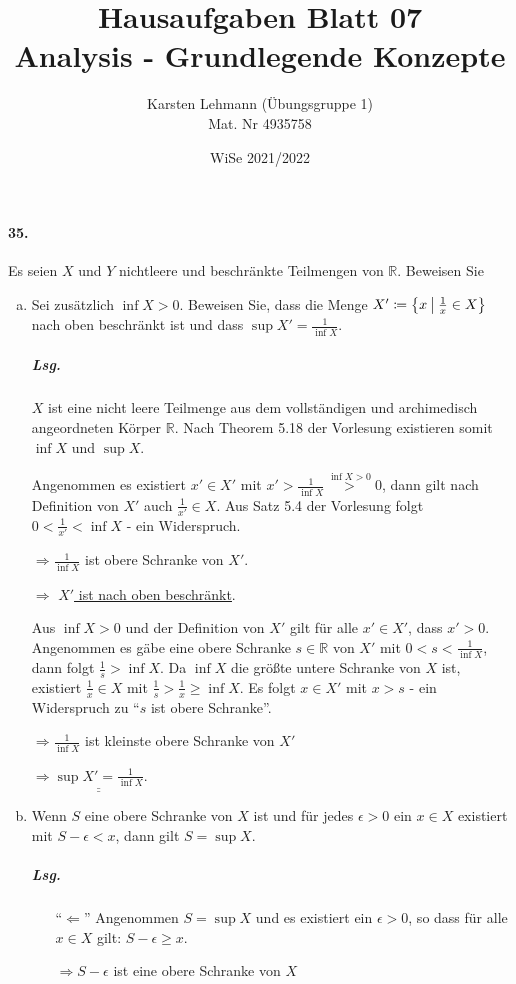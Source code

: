 \documentclass{scrreprt}
\author{Karsten Lehmann (Übungsgruppe 1)\\Mat. Nr 4935758}
\date{WiSe 2021/2022}
\title{Hausaufgaben Blatt 07\\Analysis - Grundlegende Konzepte}
\begin{document}
\paragraph{35.} Es seien $X$ und $Y$ nichtleere und beschränkte Teilmengen von
$\mathbb{R}$.
Beweisen Sie
\begin{enumerate}[(a)]
\item Sei zusätzlich $\inf X > 0$.
  Beweisen Sie, dass die Menge
  $X' \coloneqq \qty\big{x \: {\big |} \: \frac{1}{x} \in X}$
  nach oben beschränkt ist und dass
  $\sup X' = \frac{1}{\inf X}$.

  \subparagraph{Lsg.} $X$ ist eine nicht leere Teilmenge aus dem vollständigen
  und archimedisch angeordneten Körper $\mathbb{R}$.
  Nach Theorem 5.18 der Vorlesung existieren somit $\inf X$ und $\sup X$.

  Angenommen es existiert $x' \in X'$ mit
  $x' > \frac{1}{\inf X} \overset{\inf X > 0}> 0$, dann gilt nach Definition
  von $X'$ auch $\frac{1}{x'} \in X$.
  Aus Satz 5.4 der Vorlesung folgt $0 < \frac{1}{x'} < \inf X$ - ein Widerspruch.

  $\Rightarrow \frac{1}{\inf X}$ ist obere Schranke von $X'$.

  $\Rightarrow$ \underline{\underline{$X'$ ist nach oben beschränkt}}.

  Aus $\inf X > 0$ und der Definition von $X'$ gilt für alle
  $x' \in X'$, dass $x' > 0$.
  Angenommen es gäbe eine obere Schranke $s \in \mathbb{R}$ von $X'$ mit
  $0 < s < \frac{1}{\inf X}$, dann folgt $\frac{1}{s} > \inf X$.
  Da $\inf X$ die größte untere Schranke von $X$ ist, existiert
  $\frac{1}{x} \in X$ mit $\frac{1}{s} > \frac{1}{x} \geq \inf X$.
  Es folgt $x \in X'$ mit $x > s$ - ein Widerspruch zu
  ``$s$ ist obere Schranke''.

  $\Rightarrow \frac{1}{\inf X}$ ist kleinste obere Schranke von $X'$

  $\Rightarrow \underline{\underline{\sup X' = \frac{1}{\inf X}}}$.

\item Wenn $S$ eine obere Schranke von $X$ ist und für jedes $\epsilon > 0$
  ein $x \in X$ existiert mit $S - \epsilon < x$, dann gilt $S = \sup X$.

  \subparagraph{Lsg.}
  \begin{itemize}
  \item[``$\Leftarrow$''] Angenommen $S = \sup X$ und es existiert ein
    $\epsilon > 0$, so dass für alle $x \in X$ gilt: $S - \epsilon \geq x$.

    $\Rightarrow S - \epsilon$ ist eine obere Schranke von $X$


\end{itemize}
\end{enumerate}
\end{document}
